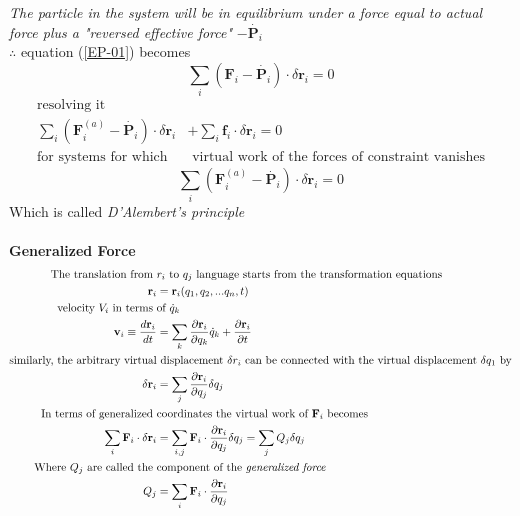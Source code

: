 \textit{The particle in the system will be in equilibrium under a force equal to actual force plus a "reversed effective force"} $-\dot{\textbf{P}_i}$\\
$\therefore$ \quad equation (\ref{EP-01}) becomes
\begin{equation}
\sum\limits_{i}(\textbf{F}_i-\dot{\textbf{P}_i})\cdot\delta \textbf{r}_i=0 \label{EP-05}
\end{equation}
\begin{align*}
\text{resolving it}\\
\sum\limits_{i}(\textbf{F}_i^{(a)}-\dot{\textbf{P}_i})\cdot\delta \textbf{r}_i&+\sum\limits_{i}\textbf{f}_i\cdot\delta \textbf{r}_i=0\\
\text{for systems for which}&\text{ virtual work of the forces of constraint vanishes}
\end{align*}
\begin{equation}
\sum\limits_{i}(\textbf{F}_i^{(a)}-\dot{\textbf{P}_i})\cdot\delta\label{EP-06} \textbf{r}_i=0
\end{equation}
Which is called \textit{D'Alembert's principle}\\\\
\textbf{Generalized Force}
\begin{align}
\text{The translation from }&\text{$r_i$ to $q_j$ language starts from the transformation equations}\notag\\
\textbf{r}_i&=\textbf{r}_i(q_1,q_2,...q_n,t)\label{EP-07}\\
\text{velocity $V_i$ in terms }&\text{of $\dot{q}_k$}\notag\\
\mathbf{v}_{i} \equiv \frac{d \mathbf{r}_{i}}{d t}&=\sum_{k} \frac{\partial \mathbf{r}_{i}}{\partial q_{k}} \dot{q}_{k}+\frac{\partial \mathbf{r}_{i}}{\partial t}\label{EP-08}\\
\text{similarly, the arbitrary virtual}&\text{ displacement $\delta r_i$ can be connected with the virtual displacement $\delta q_1$ by}\notag\\
\delta \mathbf{r}_{i}&=\sum_{j} \frac{\partial \mathbf{r}_{i}}{\partial q_{j}} \delta q_{j}\\
\text{In terms of generalized }&\text{coordinates the virtual work of $\textbf{F}_i$ becomes}\notag\\
\sum_{i} \mathbf{F}_{i} \cdot \delta \mathbf{r}_{i}&=\sum_{i, j} \mathbf{F}_{i} \cdot \frac{\partial \mathbf{r}_{i}}{\partial q_{j}} \delta q_{j}=\sum_{j} Q_{j} \delta q_{j}\label{EP-10}\\
\text{Where $Q_j$ are called the } &\text{component of the }\textit{generalized force}\notag \\
Q_{j}&=\sum_{i} \mathbf{F}_{i} \cdot \frac{\partial \mathbf{r}_{i}}{\partial q_{j}}\label{EP-11}
\end{align}
